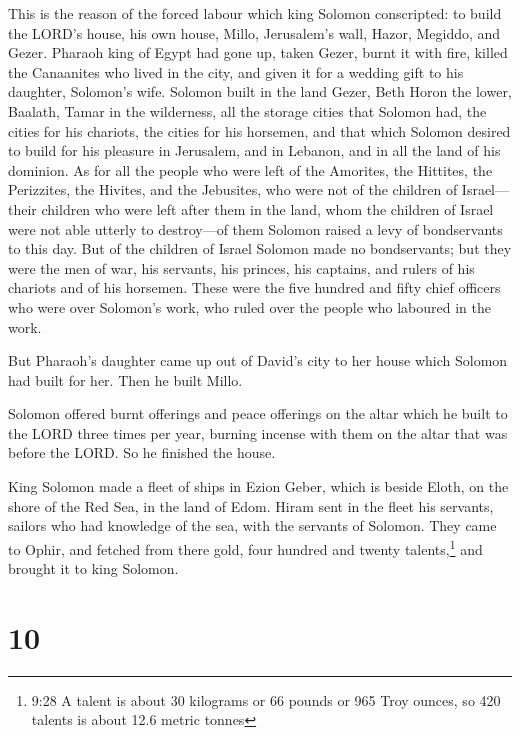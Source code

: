  This is the reason of the forced labour which king Solomon
conscripted: to build the LORD's house, his own house, Millo,
Jerusalem's wall, Hazor, Megiddo, and Gezer.  Pharaoh king
of Egypt had gone up, taken Gezer, burnt it with fire, killed the
Canaanites who lived in the city, and given it for a wedding gift to his
daughter, Solomon's wife.  Solomon built in the land Gezer,
Beth Horon the lower,  Baalath, Tamar in the wilderness,
 all the storage cities that Solomon had, the cities for
his chariots, the cities for his horsemen, and that which Solomon
desired to build for his pleasure in Jerusalem, and in Lebanon, and in
all the land of his dominion.  As for all the people who
were left of the Amorites, the Hittites, the Perizzites, the Hivites,
and the Jebusites, who were not of the children of Israel---
 their children who were left after them in the land, whom
the children of Israel were not able utterly to destroy---of them
Solomon raised a levy of bondservants to this day.  But of
the children of Israel Solomon made no bondservants; but they were the
men of war, his servants, his princes, his captains, and rulers of his
chariots and of his horsemen.  These were the five hundred
and fifty chief officers who were over Solomon's work, who ruled over
the people who laboured in the work.

 But Pharaoh's daughter came up out of David's city to her
house which Solomon had built for her. Then he built Millo.

 Solomon offered burnt offerings and peace offerings on the
altar which he built to the LORD three times per year, burning incense
with them on the altar that was before the LORD. So he finished the
house.

 King Solomon made a fleet of ships in Ezion Geber, which
is beside Eloth, on the shore of the Red Sea, in the land of Edom.
 Hiram sent in the fleet his servants, sailors who had
knowledge of the sea, with the servants of Solomon.  They
came to Ophir, and fetched from there gold, four hundred and twenty
talents,\footnote{9:28 A talent is about 30 kilograms or 66 pounds or
  965 Troy ounces, so 420 talents is about 12.6 metric tonnes} and
brought it to king Solomon.

\hypertarget{section-9}{%
\section{10}\label{section-9}}

